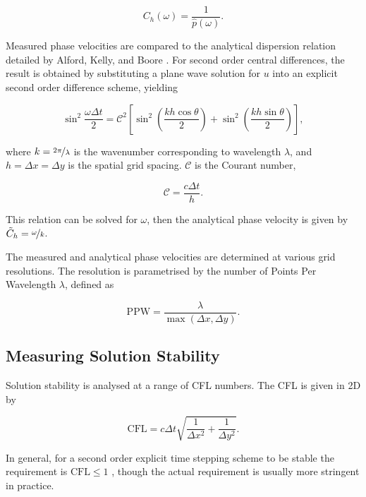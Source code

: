 \documentclass[final-report]{report-template}
\begin{document}
\begin{equation}
    C_h(\omega) = \frac{1}{\hat{p}(\omega)}.
    \label{eq:phase-v}
\end{equation}

Measured phase velocities are compared to the analytical dispersion relation detailed by Alford, Kelly, and Boore \cite{alfordAccuracyFinitedifferenceModeling1974}. For second order central differences, the result is obtained by substituting a plane wave solution for $u$ into an explicit second order difference scheme, yielding

\begin{equation}
    \sin^2{\frac{\omega \Delta t}{2}} = \mathcal{C}^2 \left[ \sin^2\left(\frac{kh\cos\theta}{2}\right) + \sin^2\left(\frac{kh\sin\theta}{2}\right) \right],
\end{equation}

where $k=\nicefrac{2\pi}{\lambda}$ is the wavenumber corresponding to wavelength $\lambda$, and $h=\Delta x = \Delta y$ is the spatial grid spacing. $\mathcal{C}$ is the Courant number,

\begin{equation}
    \mathcal{C} = \frac{c\Delta t}{h}.
\end{equation}

This relation can be solved for $\omega$, then the analytical phase velocity is given by $\tilde{C}_h = \nicefrac{\omega}{k}$. 

The measured and analytical phase velocities are determined at various grid resolutions. The resolution is parametrised by the number of Points Per Wavelength $\lambda$, defined as

\begin{equation}
    \text{PPW} = \frac{\lambda}{\max(\Delta x, \Delta y)}.
\end{equation}

\subsection{Measuring Solution Stability}

Solution stability is analysed at a range of CFL numbers. The CFL is given in 2D by

\begin{equation}
    \text{CFL} = c\Delta t\sqrt{\frac{1}{\Delta x^2} + \frac{1}{\Delta y^2}}.
\end{equation}

In general, for a second order explicit time stepping scheme to be stable the requirement is $\text{CFL} \leq 1$ \cite{courantPartialDifferenceEquations1967}, though the actual requirement is usually more stringent in practice.
\end{document}
